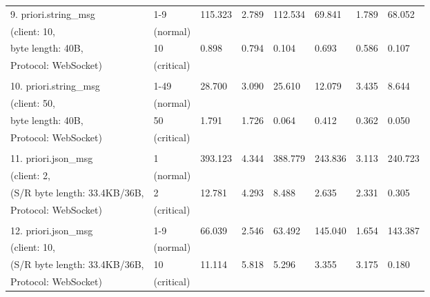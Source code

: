 \begin{table}[htbp]
\begin{tabular}{m{} m{} m{} m{} m{} m{} m{} m{}}
        9. priori.string\_msg         & 1-9        & 115.323 & 2.789  & 112.534 & 69.841  & 1.789  & 68.052  \\
        (client: 10,                  & (normal)   &         &        &         &         &        &         \\
        byte length: 40B,             & 10         & 0.898   & 0.794  & 0.104   & 0.693   & 0.586  & 0.107   \\
        Protocol: WebSocket)          & (critical) &         &        &         &         &        &         \\
        & & & & & & &\\
        10. priori.string\_msg        & 1-49       & 28.700  & 3.090  & 25.610  & 12.079  & 3.435  & 8.644   \\
        (client: 50,                  & (normal)   &         &        &         &         &        &         \\
        byte length: 40B,             & 50         & 1.791   & 1.726  & 0.064   & 0.412   & 0.362  & 0.050   \\
        Protocol: WebSocket)          & (critical) &         &        &         &         &        &         \\
        & & & & & & &\\
        11. priori.json\_msg          & 1          & 393.123 & 4.344  & 388.779 & 243.836 & 3.113  & 240.723 \\
        (client: 2,                   & (normal)   &         &        &         &         &        &         \\
        (S/R byte length: 33.4KB/36B, & 2          & 12.781  & 4.293  & 8.488   & 2.635   & 2.331  & 0.305   \\
        Protocol: WebSocket)          & (critical) &         &        &         &         &        &         \\
        & & & & & & &\\
        12. priori.json\_msg          & 1-9        & 66.039  & 2.546  & 63.492  & 145.040 & 1.654  & 143.387 \\
        (client: 10,                  & (normal)   &         &        &         &         &        &         \\
        (S/R byte length: 33.4KB/36B, & 10         & 11.114  & 5.818  & 5.296   & 3.355   & 3.175  & 0.180   \\
        Protocol: WebSocket)          & (critical) &         &        &         &         &        &         \\

\end{tabular}
\end{table}
